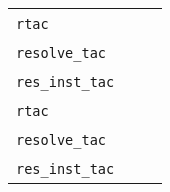 \begin{isabellebody}
\begin{isamarkuptext}
  \medskip
  \begin{tabular}{lll}
    \verb|rtac|~\isa{{\isachardoublequote}a\ {\isadigit{1}}{\isachardoublequote}} & & \isa{{\isachardoublequote}rule\ a{\isachardoublequote}} \\
    \verb|resolve_tac|~\isa{{\isachardoublequote}{\isacharbrackleft}a\isactrlsub {\isadigit{1}}{\isacharcomma}\ {\isasymdots}{\isacharbrackright}\ {\isadigit{1}}{\isachardoublequote}} & & \isa{{\isachardoublequote}rule\ a\isactrlsub {\isadigit{1}}\ {\isasymdots}{\isachardoublequote}} \\
    \verb|res_inst_tac|~\isa{{\isachardoublequote}ctxt\ {\isacharbrackleft}{\isacharparenleft}x\isactrlsub {\isadigit{1}}{\isacharcomma}\ t\isactrlsub {\isadigit{1}}{\isacharparenright}{\isacharcomma}\ {\isasymdots}{\isacharbrackright}\ a\ {\isadigit{1}}{\isachardoublequote}} & &
    \isa{{\isachardoublequote}rule{\isacharunderscore}tac\ x\isactrlsub {\isadigit{1}}\ {\isacharequal}\ t\isactrlsub {\isadigit{1}}\ {\isasymAND}\ {\isasymdots}\ {\isasymIN}\ a{\isachardoublequote}} \\[0.5ex]
    \verb|rtac|~\isa{{\isachardoublequote}a\ i{\isachardoublequote}} & & \isa{{\isachardoublequote}rule{\isacharunderscore}tac\ {\isacharbrackleft}i{\isacharbrackright}\ a{\isachardoublequote}} \\
    \verb|resolve_tac|~\isa{{\isachardoublequote}{\isacharbrackleft}a\isactrlsub {\isadigit{1}}{\isacharcomma}\ {\isasymdots}{\isacharbrackright}\ i{\isachardoublequote}} & & \isa{{\isachardoublequote}rule{\isacharunderscore}tac\ {\isacharbrackleft}i{\isacharbrackright}\ a\isactrlsub {\isadigit{1}}\ {\isasymdots}{\isachardoublequote}} \\
    \verb|res_inst_tac|~\isa{{\isachardoublequote}ctxt\ {\isacharbrackleft}{\isacharparenleft}x\isactrlsub {\isadigit{1}}{\isacharcomma}\ t\isactrlsub {\isadigit{1}}{\isacharparenright}{\isacharcomma}\ {\isasymdots}{\isacharbrackright}\ a\ i{\isachardoublequote}} & &
    \isa{{\isachardoublequote}rule{\isacharunderscore}tac\ {\isacharbrackleft}i{\isacharbrackright}\ x\isactrlsub {\isadigit{1}}\ {\isacharequal}\ t\isactrlsub {\isadigit{1}}\ {\isasymAND}\ {\isasymdots}\ {\isasymIN}\ a{\isachardoublequote}} \\
  \end{tabular}
  \medskip


\end{isamarkuptext}
\end{isabellebody}
